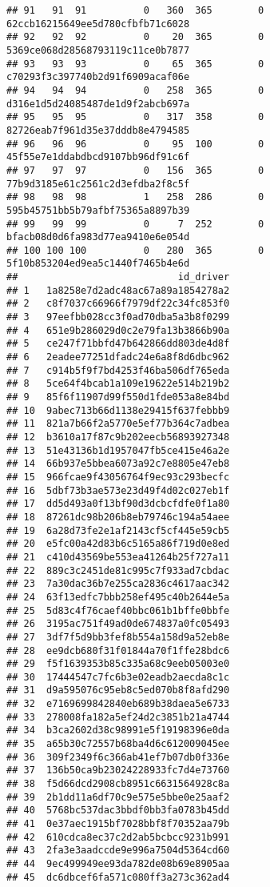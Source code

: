 \documentclass[
]{article}
\begin{document}
\begin{verbatim}
## 91   91  91          0   360  365        0 62ccb16215649ee5d780cfbfb71c6028
## 92   92  92          0    20  365        0 5369ce068d28568793119c11ce0b7877
## 93   93  93          0    65  365        0 c70293f3c397740b2d91f6909acaf06e
## 94   94  94          0   258  365        0 d316e1d5d24085487de1d9f2abcb697a
## 95   95  95          0   317  358        0 82726eab7f961d35e37dddb8e4794585
## 96   96  96          0    95  100        0 45f55e7e1ddabdbcd9107bb96df91c6f
## 97   97  97          0   156  365        0 77b9d3185e61c2561c2d3efdba2f8c5f
## 98   98  98          1   258  286        0 595b45751bb5b79afbf75365a8897b39
## 99   99  99          0     7  252        0 bfacb08d0d6fa983d77ea9410e6e054d
## 100 100 100          0   280  365        0 5f10b853204ed9ea5c1440f7465b4e6d
##                            id_driver
## 1   1a8258e7d2adc48ac67a89a1854278a2
## 2   c8f7037c66966f7979df22c34fc853f0
## 3   97eefbb028cc3f0ad70dba5a3b8f0299
## 4   651e9b286029d0c2e79fa13b3866b90a
## 5   ce247f71bbfd47b642866dd803de4d8f
## 6   2eadee77251dfadc24e6a8f8d6dbc962
## 7   c914b5f9f7bd4253f46ba506df765eda
## 8   5ce64f4bcab1a109e19622e514b219b2
## 9   85f6f11907d99f550d1fde053a8e84bd
## 10  9abec713b66d1138e29415f637febbb9
## 11  821a7b66f2a5770e5ef77b364c7adbea
## 12  b3610a17f87c9b202eecb56893927348
## 13  51e43136b1d1957047fb5ce415e46a2e
## 14  66b937e5bbea6073a92c7e8805e47eb8
## 15  966fcae9f43056764f9ec93c293becfc
## 16  5dbf73b3ae573e23d49f4d02c027eb1f
## 17  dd5d493a0f13bf90d3dcbcfdfe0f1a80
## 18  87261dc98b206b8eb79746c194a54aee
## 19  6a28d73fe2e1af2143cf5cf445e59cb5
## 20  e5fc00a42d83b6c5165a86f719d0e8ed
## 21  c410d43569be553ea41264b25f727a11
## 22  889c3c2451de81c995c7f933ad7cbdac
## 23  7a30dac36b7e255ca2836c4617aac342
## 24  63f13edfc7bbb258ef495c40b2644e5a
## 25  5d83c4f76caef40bbc061b1bffe0bbfe
## 26  3195ac751f49ad0de674837a0fc05493
## 27  3df7f5d9bb3fef8b554a158d9a52eb8e
## 28  ee9dcb680f31f01844a70f1ffe28bdc6
## 29  f5f1639353b85c335a68c9eeb05003e0
## 30  17444547c7fc6b3e02eadb2aecda8c1c
## 31  d9a595076c95eb8c5ed070b8f8afd290
## 32  e7169699842840eb689b38daea5e6733
## 33  278008fa182a5ef24d2c3851b21a4744
## 34  b3ca2602d38c98991e5f19198396e0da
## 35  a65b30c72557b68ba4d6c612009045ee
## 36  309f2349f6c366ab41ef7b07db0f336e
## 37  136b50ca9b23024228933fc7d4e73760
## 38  f5d66dcd2908cb8951c6631564928c8a
## 39  2b1dd11a6df70c9e575e5bbe0e25aaf2
## 40  5768bc537dac3bbdf0bb3fa0783b45dd
## 41  0e37aec1915bf7028bbf8f70352aa79b
## 42  610cdca8ec37c2d2ab5bcbcc9231b991
## 43  2fa3e3aadccde9e996a7504d5364cd60
## 44  9ec499949ee93da782de08b69e8905aa
## 45  dc6dbcef6fa571c080ff3a273c362ad4

\end{verbatim}
\end{document}
